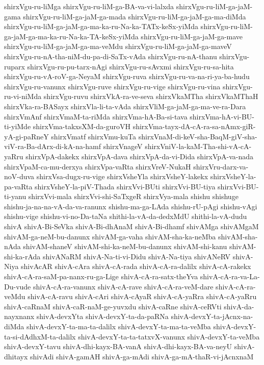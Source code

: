 {shirxVgu-ru-liMga
shirxVgu-ru-liM-ga-BA-va-vi-lalxda
shirxVgu-ru-liM-ga-jaM-gama
shirxVgu-ru-liM-ga-jaM-ga-mada
shirxVgu-ru-liM-ga-jaM-ga-ma-diMda
shirxVgu-ru-liM-ga-jaM-ga-ma-ka-ru-Na-ka-TATx-keSx-yiMda
shirxVgu-ru-liM-ga-jaM-ga-ma-ka-ru-Na-ka-TA-keSx-yiMda
shirxVgu-ru-liM-ga-jaM-ga-mave
shirxVgu-ru-liM-ga-jaM-ga-ma-veMdu
shirxVgu-ru-liM-ga-jaM-ga-maveV
shirxVgu-ru-nA-tha-niM-du-pa-di-SaTx-vAda
shirxVgu-ru-nA-thanu
shirxVgu-ruparx
shirxVgu-ru-pu-tarx-nAgi
shirxVgu-ru-sAvxmi
shirxVgu-ru-sa-hita
shirxVgu-ru-vA-roV-ga-NeyaM
shirxVgu-ruva
shirxVgu-ru-va-na-ri-ya-ba-hudu
shirxVgu-ru-vanunx
shirxVgu-ruve
shirxVgu-ru-vige
shirxVgu-ru-vina
shirxVgu-ru-vi-niMda
shirxVgu-ruvu
shirxVkA-ra-ve-seva
shirxVkaMTha
shirxVkaMThaH
shirxVka-ra-BASayx
shirxVla-li-ta-vAda
shirxVliM-ga-jaM-ga-ma-ve-ra-Dara
shirxVmAnf
shirxVmaM-ta-riMda
shirxVma-hA-Ba-si-tava
shirxVma-hA-vi-BU-ti-yiMde
shirxVma-takxsXM-da-guroVH
shirxVma-tayx-dA-cA-ra-sa-nAmx-giR-yA-gi-paRneY
shirxVmatf
shirxVmu-kuTa
shirxVnaM-di-keV-sha-BaqM-giV-sha-viV-ra-Ba-dArx-di-kA-na-hamf
shirxVnageV
shirxVniV-la-kaM-Tha-shi-vA-cA-yaRru
shirxVpA-dakekx
shirxVpA-dava
shirxVpA-da-vi-Dida
shirxVpA-va-nada
shirxVpaM-ca-mu-derxya
shirxVpa-vaRta
shirxVreV-NukaH
shirxVru-darx-va-noV-duva
shirxVsa-dugx-ru-vige
shirxVsheYla
shirxVsheY-lakekx
shirxVsheY-la-pa-vaRta
shirxVsheY-la-piV-Thada
shirxVvi-BUti
shirxVvi-BU-tiya
shirxVvi-BU-ti-yanu
shirxVvi-mala
shirxVvi-shi-SaTxgeR
shirxVya-mala
shishu
shishuge
shishu-ja-na-na-vA-da-va-ranunx
shishu-ma-ga-LAda
shishu-rU-pAgi
shishu-vAgi
shishu-vige
shishu-vi-no-Da-taNa
shithi-la-vA-da-dedxMdU
shithi-la-vA-dudu
shivA
shivA-Bi-SeVka
shivA-Bi-dhAnaM
shivA-Bi-dhamf
shivAMga
shivAMgaM
shivAM-ga-neM-bu-danunx
shivAM-ga-vaha
shivAM-sha-ka-neMba
shivAM-sha-nAda
shivAM-shaneV
shivAM-shi-ka-neM-bu-danunx
shivAM-shi-kanu
shivAM-shi-ka-rAda
shivANaRM
shivA-Na-ti-vi-Didu
shivA-Na-tiya
shivANeRV
shivA-Niya
shivAcAR
shivA-cAra
shivA-cA-rada
shivA-cA-ra-dalilx
shivA-cA-rakekx
shivA-cA-ra-saM-pa-nanx-ru-ga-Lige
shivA-cA-ra-satx-theYva
shivA-cA-ra-va-La-Du-vude
shivA-cA-ra-vanunx
shivA-cA-rave
shivA-cA-ra-veM-dare
shivA-cA-ra-veMdu
shivA-cA-ravu
shivA-cAri
shivA-cAyaR
shivA-cA-yaRra
shivA-cA-yaRru
shivA-caRnaM
shivA-caR-naM-ge-yuvxdu
shivA-caRne
shivA-ceRVti
shivA-da-nayxnanx
shivA-devxYta
shivA-devxY-ta-da-paRNa
shivA-devxY-ta-jAcnx-na-diMda
shivA-devxY-ta-ma-ta-dalilx
shivA-devxY-ta-ma-ta-veMba
shivA-devxY-ta-si-dAdhxM-ta-dalilx
shivA-devxY-ta-ta-tatxvX-vanunx
shivA-devxY-ta-veMba
shivA-devxY-tavu
shivA-dhi-kayx-BA-vanA
shivA-dhi-kayx-BA-va-neyU
shivA-dhitayx
shivAdi
shivA-gamAH
shivA-ga-mAdi
shivA-ga-mA-thaR-vi-jAcnxnaM
}
